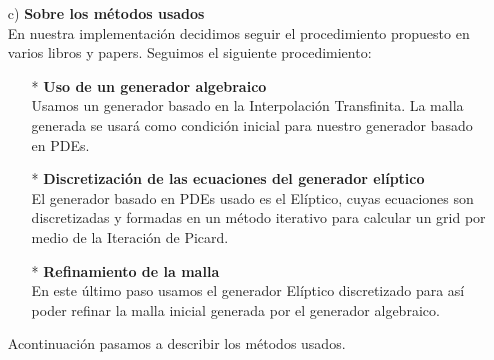 \documentclass{article}
\begin{document}
\begin{enumerate}
\begin{itemize}
\begin{itemize}
	\end{itemize}



\item[c)] \textbf{ Sobre los m\'etodos usados }
\\
	En nuestra implementaci\'on decidimos seguir el procedimiento propuesto en varios libros y papers. Seguimos el 
	siguiente procedimiento: 

	\begin{itemize}
		\item[*] \textbf{ Uso de un generador algebraico }
		\\
		Usamos un generador basado en la Interpolaci\'on Transfinita. La malla generada se usar\'a como condici\'on 
		inicial para nuestro generador basado en PDEs.
		\item[*] \textbf{ Discretizaci\'on de las ecuaciones del generador el\'iptico }
		\\
		El generador basado en PDEs usado es el El\'iptico, cuyas ecuaciones son discretizadas y formadas en un 
		m\'etodo iterativo para calcular un grid por medio de la Iteraci\'on de Picard.
		\item[*] \textbf{ Refinamiento de la malla }
		\\ En este \'ultimo paso usamos el generador El\'iptico discretizado para as\'i poder refinar la malla
		inicial generada por el generador algebraico.
	\end{itemize}

	Acontinuaci\'on pasamos a describir los m\'etodos usados.

	\begin{itemize}


\end{itemize}
\end{itemize}
\end{enumerate}
\end{document}

